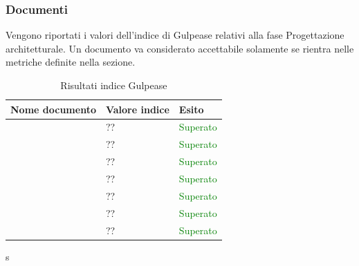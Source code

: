 	 	\subsubsection{Documenti}	 	
	 	Vengono riportati i valori dell'indice di Gulpease relativi alla fase Progettazione architetturale. Un documento va considerato accettabile solamente se rientra nelle metriche definite nella sezione.
		\begin{table}[!ht]
			\begin{center}
				\begin{tabularx}{0.9\textwidth}{|l|l|X|}
					\hline
					\textbf{Nome documento} & \textbf{Valore indice} & \textbf{Esito}\\
					\hline						
					\docNameVersionAdR & ?? & \textcolor{green}{Superato}\\
					\hline
					\docNameVersionGlo & ?? & \textcolor{green}{Superato}\\
					\hline					
					\docNameVersionNdP & ?? & \textcolor{green}{Superato}\\
					\hline					
					\docNameVersionPdP & ?? & \textcolor{green}{Superato}\\
					\hline					
					\docNameVersionPdQ & ?? & \textcolor{green}{Superato}\\
					\hline					
					\docNameVersionSdF & ?? & \textcolor{green}{Superato}\\
					\hline	
					\docNameVersionST & ?? & \textcolor{green}{Superato}\\
					\hline			
				\end{tabularx}
			\end{center}
			\caption{Risultati indice Gulpease}
		\end{table}s
	
\pagebreak